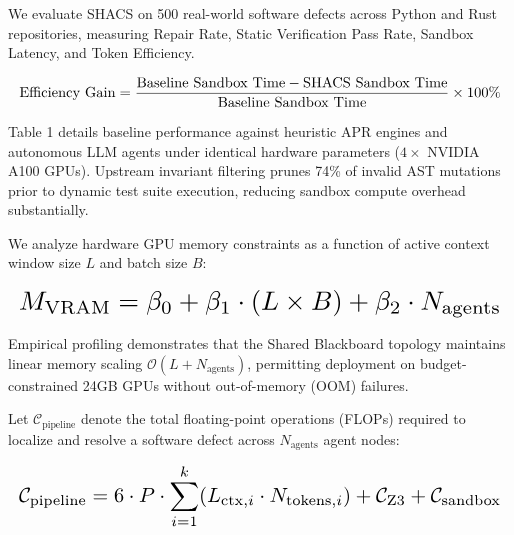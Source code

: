 \documentclass[11pt,a4paper]{article}
\begin{document}
We evaluate SHACS on 500 real-world software defects across Python and Rust repositories, measuring Repair Rate, Static Verification Pass Rate, Sandbox Latency, and Token Efficiency.


\begin{equation}
\resizebox{\columnwidth}{!}{$\displaystyle
\begin{aligned}
\text{Efficiency Gain} = \frac{\text{Baseline Sandbox Time} - \text{SHACS Sandbox Time}}{\text{Baseline Sandbox Time}} \times 100\%
\end{aligned}
$}
\end{equation}





Table 1 details baseline performance against heuristic APR engines and autonomous LLM agents under identical hardware parameters ($4\times$ NVIDIA A100 GPUs). Upstream invariant filtering prunes 74\% of invalid AST mutations prior to dynamic test suite execution, reducing sandbox compute overhead substantially.




We analyze hardware GPU memory constraints as a function of active context window size $L$ and batch size $B$:

\begin{equation}
\resizebox{\columnwidth}{!}{$\displaystyle
\begin{aligned}
M_{\text{VRAM}} = \beta_0 + \beta_1 \cdot (L \times B) + \beta_2 \cdot N_{\text{agents}}
\end{aligned}
$}
\end{equation}


Empirical profiling demonstrates that the Shared Blackboard topology maintains linear memory scaling $\mathcal{O}(L + N_{\text{agents}})$, permitting deployment on budget-constrained 24GB GPUs without out-of-memory (OOM) failures.

Let $\mathcal{C}_{\text{pipeline}}$ denote the total floating-point operations (FLOPs) required to localize and resolve a software defect across $N_{\text{agents}}$ agent nodes:

\begin{equation}
\resizebox{\columnwidth}{!}{$\displaystyle
\begin{aligned}
\mathcal{C}_{\text{pipeline}} = 6 \cdot P \cdot \sum_{i=1}^k (L_{\text{ctx},i} \cdot N_{\text{tokens},i}) + \mathcal{C}_{\text{Z3}} + \mathcal{C}_{\text{sandbox}}
\end{aligned}
$}
\end{equation}
\end{document}
